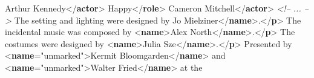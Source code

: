 \begin{shaded}
\hspace*{1em}\hspace*{1em}Arthur Kennedy{</\textbf{actor}>}\mbox{}\newline 
\hspace*{1em}\mbox{}\newline 
\hspace*{1em}\mbox{}\newline 
\hspace*{1em}\hspace*{1em}Happy{</\textbf{role}>}\mbox{}\newline 
\hspace*{1em}\hspace*{1em}Cameron Mitchell{</\textbf{actor}>}\mbox{}\newline 
\hspace*{1em}\mbox{}\newline 
\textit{<!-- ... -->}\mbox{}\newline 
{}\mbox{}\newline 
{}The setting and lighting were designed by\mbox{}\newline 
{}Jo Mielziner{</\textbf{name}>}.{</\textbf{p}>}\mbox{}\newline 
{}The incidental music was composed by {<\textbf{name}>}Alex North{</\textbf{name}>}.{</\textbf{p}>}\mbox{}\newline 
{}The costumes were designed by {<\textbf{name}>}Julia Sze{</\textbf{name}>}.{</\textbf{p}>}\mbox{}\newline 
{}Presented by {<\textbf{name}\hspace*{1em}{rend}="{unmarked}">}Kermit Bloomgarden{</\textbf{name}>}\mbox{}\newline 
\hspace*{1em}\hspace*{1em} and {<\textbf{name}\hspace*{1em}{rend}="{unmarked}">}Walter Fried{</\textbf{name}>} at the\mbox{}\newline 

\end{shaded}
